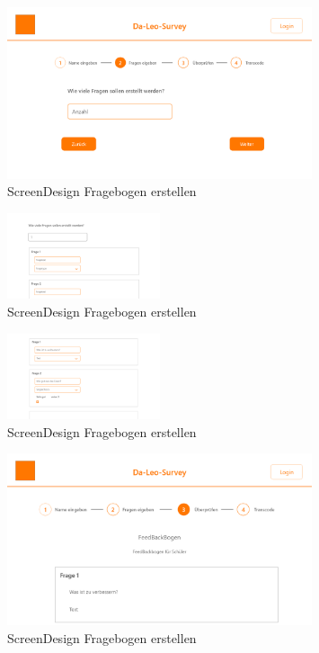 \begin{figure}[H]
    \includegraphics[width=0.8\textwidth]{pics/Erstellen_Umfarage_2.png}
    \centering
    \caption{ScreenDesign Fragebogen erstellen}
\end{figure}

\begin{figure}[H]
    \includegraphics[width=0.4\textwidth]{pics/Erstellen_Umfarage_2_1.png}
    \centering
    \caption{ScreenDesign Fragebogen erstellen}
\end{figure}

\begin{figure}[H]
    \includegraphics[width=0.4\textwidth]{pics/Erstellen_Umfarage_2_2.png}
    \centering
    \caption{ScreenDesign Fragebogen erstellen}
\end{figure}

\begin{figure}[H]
    \includegraphics[width=0.8\textwidth]{pics/Erstellen_Umfarage_3.png}
    \centering
    \caption{ScreenDesign Fragebogen erstellen}
\end{figure}

